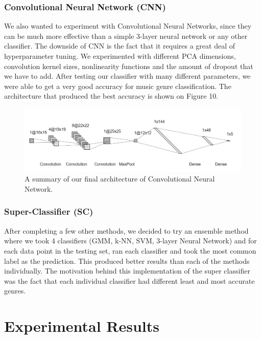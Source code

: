 \subsubsection{\textbf{Convolutional Neural Network (CNN)}}
We also wanted to experiment with Convolutional Neural Networks, since they can be much more effective than a simple 3-layer neural network or any other classifier. The downside of CNN is the fact that it requires a great deal of hyperparameter tuning. We experimented with different PCA dimensions, convolution kernel sizes, nonlinearity functions and the amount of dropout that we have to add. After testing our classifier with many different parameters, we were able to get a very good accuracy for music genre classification. The architecture that produced the best accuracy is shown on Figure 10. 
\begin{figure}
\begin{center}
\includegraphics[scale=0.2]{./figures/arch_cnn.png}
\end{center}
\caption
{
A summary of our final architecture of Convolutional Neural Network.
}
\label{fig:big_picture1}
\end{figure}


\subsubsection{\textbf{Super-Classifier (SC)}}
After completing a few other methods, we decided to try an ensemble method where we took 4 classifiers (GMM, k-NN, SVM, 3-layer Neural Network) and for each data point in the testing set, ran each classifier and took the most common label as the prediction. This produced better results than each of the methods individually. The motivation behind this implementation of the super classifier was the fact that each individual classifier had different least and most accurate genres. 

\section{Experimental Results}\label{sec:results}
